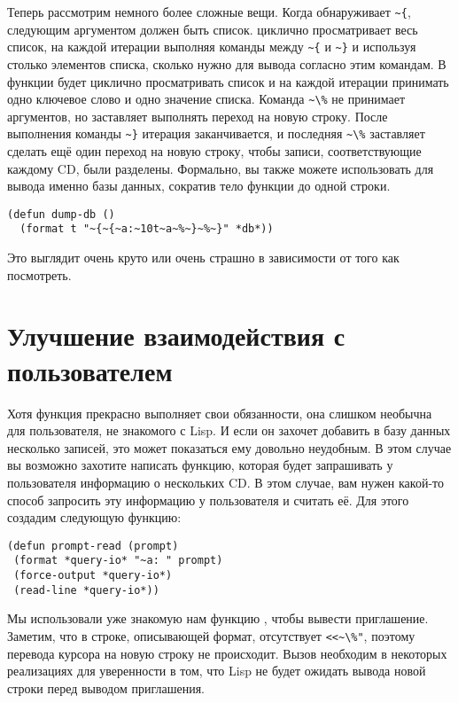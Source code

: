 Теперь рассмотрим немного более сложные вещи. Когда  обнаруживает
\lstinline!~{!, следующим аргументом должен быть список.  циклично
  просматривает весь список, на каждой итерации выполняя команды между \lstinline!~{! и
    \lstinline!~}! и используя столько элементов списка, сколько нужно для вывода согласно
  этим командам. В функции   будет циклично просматривать
  список и на каждой итерации принимать одно ключевое слово и одно значение
  списка. Команда \lstinline!~\%! не принимает аргументов, но заставляет 
  выполнять переход на новую строку. После выполнения команды \lstinline!~}! итерация
заканчивается, и последняя \lstinline!~\%! заставляет  сделать ещё один
переход на новую строку, чтобы записи, соответствующие каждому CD, были разделены.
Формально, вы также можете использовать  для вывода именно базы данных,
сократив тело функции  до одной строки.

\begin{lstlisting}
(defun dump-db ()
  (format t "~{~{~a:~10t~a~%~}~%~}" *db*))
\end{lstlisting}

Это выглядит очень круто или очень страшно в зависимости от того как посмотреть.

\section{Улучшение взаимодействия с пользователем}

Хотя функция  прекрасно выполняет свои обязанности, она слишком необычна
для пользователя, не знакомого с Lisp. И если он захочет добавить в базу данных несколько
записей, это может показаться ему довольно неудобным. В этом случае вы возможно захотите
написать функцию, которая будет запрашивать у пользователя информацию о нескольких CD. В
этом случае, вам нужен какой-то способ запросить эту информацию у пользователя и считать
её. Для этого создадим следующую функцию:

\begin{lstlisting}
(defun prompt-read (prompt)
 (format *query-io* "~a: " prompt)
 (force-output *query-io*)
 (read-line *query-io*))
\end{lstlisting}

Мы использовали уже знакомую нам функцию , чтобы вывести
приглашение. Заметим, что в строке, описывающей формат, отсутствует \lstinline{<<~\%"},
поэтому перевода курсора на новую строку не происходит. Вызов 
необходим в некоторых реализациях для уверенности в том, что Lisp не будет ожидать вывода
новой строки перед выводом приглашения.

